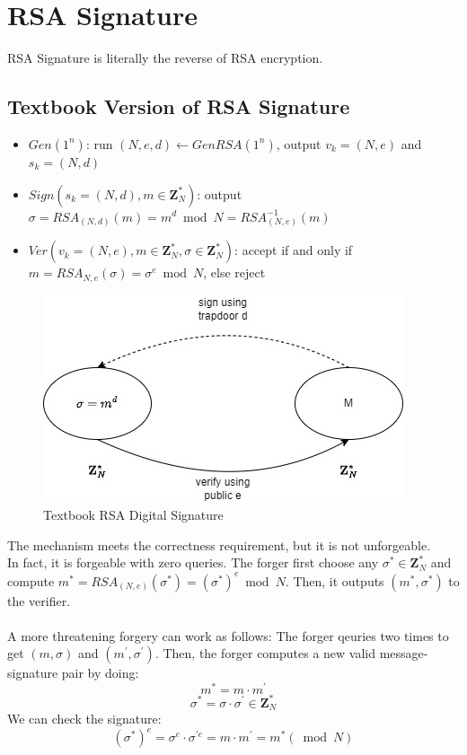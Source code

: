 \documentclass{scribe}
\begin{document}
\section{RSA Signature}
RSA Signature is literally the reverse of RSA encryption.
\subsection{Textbook Version of RSA Signature}
\begin{itemize}
    \item $Gen(1^n)$: run $(N,e,d) \leftarrow GenRSA(1^n)$, output $v_k = (N,e)$ and $s_k = (N,d)$
    \item $Sign(s_k=(N,d), m \in \mathbf{Z}_N^*)$: output $\sigma = RSA_(N,d)(m) = m^d \bmod N = RSA_{(N,e)}^{-1}(m)$
    \item $Ver(v_k=(N,e), m \in \mathbf{Z}_N^*, \sigma \in \mathbf{Z}_N^*)$: accept if and only if $m=RSA_{N,e}(\sigma) = \sigma^e \bmod N$, else reject
\end{itemize}
\begin{figure}[H]
    \centering
    \includegraphics[scale=0.5]{rsa_signature.jpg}
    \caption{Textbook RSA Digital Signature}
\end{figure}
The mechanism meets the correctness requirement, but it is not unforgeable. 
\\
In fact, it is forgeable with zero queries. The forger first choose any $\sigma^* \in \mathbf{Z}_N^*$ and compute $m^* = RSA_{(N,e)}(\sigma^*) = (\sigma^*)^e \bmod N$. Then, it outputs $(m^*, \sigma^*)$ to the verifier.
\\\\
A more threatening forgery can work as follows:
The forger qeuries two times to get $(m, \sigma)$ and $(m^{'},\sigma^{'})$.
Then, the forger computes a new valid message-signature pair by doing:
\[ m^* = m \cdot m^{'} \]
\[\sigma^{*} = \sigma \cdot \sigma^{'} \in \mathbf{Z}_N^*\]
We can check the signature:
\[(\sigma^{*})^e = \sigma^e \cdot \sigma^{'e} = m \cdot m^{'} = m^{*} (\bmod N)\]
\vspace{5mm}
\end{document}
